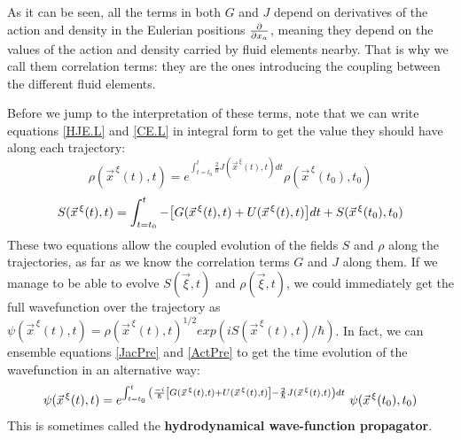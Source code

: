 \documentclass[11pt, a4paper]{article} %
\begin{document}
As it can be seen, all the terms in both $G$ and $J$ depend on derivatives of the action and density in the Eulerian positions $\pdv{}{x_a}$, meaning they depend on the values of the action and density carried by fluid elements nearby. That is why we call them correlation terms: they are the ones introducing the coupling between the different fluid elements.

Before we jump to the interpretation of these terms, note that we can write equations \eqref{HJE.L} and \eqref{CE.L} in integral form to get the value they should have along each trajectory:
\begin{equation}\label{JacPre}
\rho(\vec{x}^{\, \xi}(t),t)=e^{\int_{t=t_0}^t \frac{2}{\hbar}J(\vec{x}^{\, \xi}(t),t) dt}\rho(\vec{x}^{\, \xi}(t_0),t_0)
\end{equation}
\begin{equation}\label{ActPre}
S(\vec{x}^{\, \xi}(t),t)=\int_{t=t_0}^t -\qty[G(\vec{x}^{\, \xi}(t),t)+U(\vec{x}^{\, \xi}(t),t)] dt+S(\vec{x}^{\, \xi}(t_0),t_0)
\end{equation}
These two equations allow the coupled evolution of the fields $S$ and $\rho$ along the trajectories, as far as we know the correlation terms $G$ and $J$ along them. If we manage to be able to evolve $S(\vec{\xi},t)$ and $\rho(\vec{\xi},t)$, we could immediately get the full wavefunction over the trajectory as $\psi(\vec{x}^{\, \xi}(t),t)=\rho(\vec{x}^{\, \xi}(t),t)^{1/2}exp(iS(\vec{x}^{\, \xi}(t),t)/\hbar)$. In fact, we can ensemble equations \eqref{JacPre} and \eqref{ActPre} to get the time evolution of the wavefunction in an alternative way:
\begin{equation}
\psi(\vec{x}^{\, \xi}(t),t)=e^{\int_{t=t_0}^t\qty( \frac{-i}{\hbar} \qty[G(\vec{x}^{\, \xi}(t),t)+U(\vec{x}^{\, \xi}(t),t)]- \frac{2}{\hbar}J(\vec{x}^{\, \xi}(t),t) )dt}\ \psi(\vec{x}^{\, \xi}(t_0),t_0)
\end{equation}
This is sometimes called the {\bf hydrodynamical wave-function propagator}.
\end{document}
